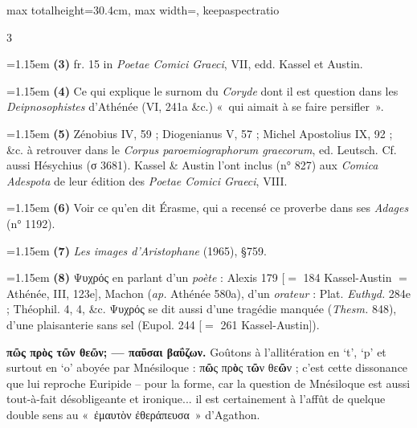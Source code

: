 \documentclass[11pt,twoside]{book}
\newcommand{\italique}[1]{\textit{#1}}
\begin{document}
\begin{adjustbox}{max totalheight=30.4cm, max width=\textwidth, keepaspectratio}
\begin{minipage}{\textwidth}
{\begin{multicols}{3}
\par\vspace{1.5pt}
\noindent\hangindent=1.15em {\color{sepiaNote}\textbf{(3)}} fr. 15 in \italique{Poetae Comici Graeci}, VII, edd. Kassel et Austin.
\par\vspace{1.5pt}
\noindent\hangindent=1.15em {\color{sepiaNote}\textbf{(4)}} Ce qui explique le surnom du \italique{Coryde} dont il est question dans les \italique{Deipnosophistes} d'Athénée (VI, 241a \&c.) «~qui aimait à se faire persifler~».
\par\vspace{1.5pt}
\noindent\hangindent=1.15em {\color{sepiaNote}\textbf{(5)}} Zénobius IV, 59 ; Diogenianus V, 57 ; Michel Apostolius IX, 92 ; \&c. à retrouver dans le \italique{Corpus paroemiographorum graecorum}, ed. Leutsch. Cf. aussi Hésychius (σ 3681). Kassel \& Austin l'ont inclus (n° 827) aux \italique{Comica Adespota} de leur édition des \italique{Poetae Comici Graeci}, VIII.
\par\vspace{1.5pt}
\noindent\hangindent=1.15em {\color{sepiaNote}\textbf{(6)}} Voir ce qu'en dit Érasme, qui a recensé ce proverbe dans ses \italique{Adages} (n° 1192).
\par\vspace{1.5pt}
\noindent\hangindent=1.15em {\color{sepiaNote}\textbf{(7)}} \italique{Les images d'Aristophane} (1965), §759.
\par\vspace{1.5pt}
\noindent\hangindent=1.15em {\color{sepiaNote}\textbf{(8)}} Ψυχρός en parlant d'un \italique{poète} : Alexis 179 [$=$ 184 Kassel-Austin $=$ Athénée, III, 123e], Machon (\italique{ap.} Athénée 580a), d'un \italique{orateur} : Plat. \italique{Euthyd.} 284e ; Théophil. 4, 4, \&c. Ψυχρός se dit aussi d'une tragédie manquée (\italique{Thesm.} 848), d'une plaisanterie sans sel (Eupol. 244 [$=$ 261 Kassel-Austin]).
\par\vspace{1.5pt}
 \textbf{πῶς πρὸς τῶν θεῶν; — παῦσαι βαΰζων.} Goûtons à l'allitération en `t', `p' et surtout en `o' aboyée par Mnésiloque : π\textbf{ῶ}ς πρ\textbf{ὸ}ς τ\textbf{ῶ}ν θε\textbf{ῶ}ν ; c'est cette dissonance que lui reproche Euripide – pour la forme, car la question de Mnésiloque est aussi tout-à-fait désobligeante et ironique... il est certainement à l'affût de quelque double sens au «~ἐμαυτὸν ἐθεράπευσα~» d'Agathon.

\end{multicols}}
\end{minipage}
\end{adjustbox}
\end{document}
